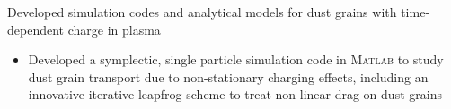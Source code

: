 \documentclass[12pt,a4paper,sans]{moderncv} %
\begin{document}
{
Developed simulation codes and analytical models for dust grains with time-dependent charge in plasma
\begin{itemize}
\item Developed a symplectic, single particle simulation code in \textsc{Matlab} to study dust grain transport due to non-stationary charging effects, including an innovative iterative leapfrog scheme to treat non-linear drag on dust grains

\end{itemize}}
\end{document}

